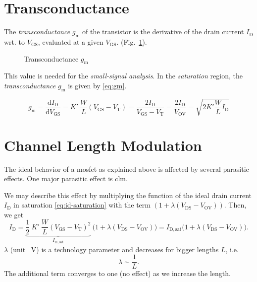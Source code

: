 \documentclass{article}[11pt]
\begin{document}
\section{Transconductance}\label{sec:gm}

The \textit{transconductance} $g_{\mathrm{m}}$ of the transistor is the 
derivative of the drain current $I_{\mathrm{D}}$ wrt. to 
$V_{\mathrm{GS}}$, evaluated at a given $V_{\mathrm{GS}}$.
(Fig.~\ref{fig:squarelaw-gm}).

\begin{figure}[H]
  \centering
  \begin{tikzpicture}[scale=1.2]
    
  \end{tikzpicture} 
  \caption{Transconductance $g_{\mathrm{m}}$}
  \label{fig:squarelaw-gm}
\end{figure}

This value is needed for the \textit{small-signal analysis}.
In the \textit{saturation} region, the 
\textit{transconductance} $g_{\mathrm{m}}$ is given by \eqref{eq:gm}.

\begin{equation}\label{eq:gm}
g_{\mathrm{m}} = \frac{\mathrm{d} I_{\mathrm{D}}}{\mathrm{d} V_{\mathrm{GS}}} 
               = K' \ \frac{W}{L} (V_{\mathrm{GS}}-V_{\mathrm{T}}) 
               = \frac{2 I_{\mathrm{D}}}{V_{\mathrm{GS}}-V_{\mathrm{T}}}  
               = \frac{2 I_{\mathrm{D}}}{V_{\mathrm{OV}}}
               = \sqrt{2 K' \frac{W}{L} I_{\mathrm{D}}}
\end{equation}

\section{Channel Length Modulation}\label{sec:clm}

The ideal behavior of a \gls{mosfet} as explained above is affected by
several parasitic effects.
One major parasitic effect is \gls{clm}.

\medskip

We may describe this effect by multiplying the function of the ideal drain
current $I_{\mathrm{D}}$ in saturation \eqref{eq:id-saturation} with the term 
$ \left(1 + \lambda \left(V_{\mathrm{DS}}-V_{\mathrm{OV}}\right)\right)$.
Then, we get
\begin{equation}
 I_{\mathrm{D}} 
 = \underbrace{\frac{1}{2} \ K' \ \frac{W}{L} (V_{\mathrm{GS}}-V_{\mathrm{T}})^2}_{I_{\mathrm{D,sat}}} \ 
  \big(1 + \lambda \left(V_{\mathrm{DS}}-V_{\mathrm{OV}}\right)\big)
 = I_{\mathrm{D,sat}} \big(1 + \lambda \left(V_{\mathrm{DS}}-V_{\mathrm{OV}}\right)\big).
\end{equation}
$\lambda$ (unit \si{\per\volt}) is a technology parameter and decreases for 
bigger lengths $L$, i.e.
\begin{equation}
\lambda \sim \frac{1}{L}.
\end{equation}
The additional term converges to one (no effect) as we increase the
length.
\end{document}
